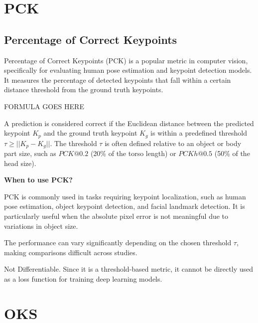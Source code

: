 \section{PCK}
\subsection{Percentage of Correct Keypoints}

Percentage of Correct Keypoints (PCK) is a popular metric in computer vision, specifically for evaluating human pose estimation
and keypoint detection models. It measures the percentage of detected keypoints that fall within a certain distance threshold
from the ground truth keypoints.

\begin{center}
    FORMULA GOES HERE
\end{center}

A prediction is considered correct if the Euclidean distance between the predicted keypoint $K_p$ and the ground truth
keypoint $K_g$ is within a predefined threshold $\tau \geq ||K_p - K_g||$. The threshold $\tau$ is often defined
relative to an object or body part size, such as $PCK@0.2$ (20\% of the torso length) or $PCKh@0.5$ (50\% of the head size).

\textbf{When to use PCK?}

PCK is commonly used in tasks requiring keypoint localization, such as human pose estimation, object keypoint detection,
and facial landmark detection. It is particularly useful when the absolute pixel error is not meaningful due to variations
in object size.

{
\item The performance can vary significantly depending on the chosen threshold $\tau$, making comparisons difficult across
studies.
\item Not Differentiable. Since it is a threshold-based metric, it cannot be directly used as a loss function for training
deep learning models.
}

\clearpage
\thispagestyle{cvstyle}
\section{OKS}
